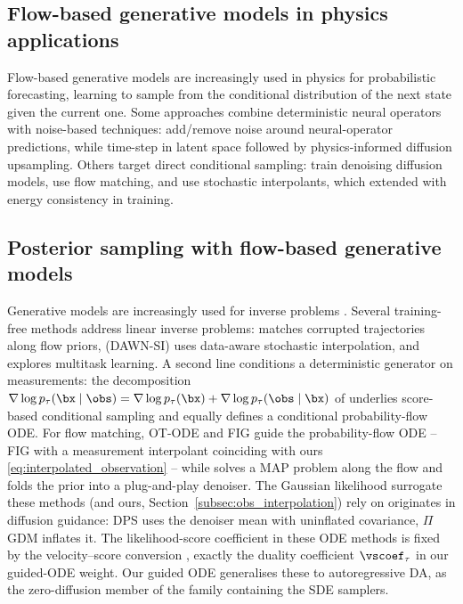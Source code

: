 
\subsection{Flow-based generative models in physics applications}

Flow-based generative models are increasingly used in physics for probabilistic forecasting, learning to sample from the conditional distribution of the next state given the current one. Some approaches combine deterministic neural operators with noise-based techniques: \cite{lippe_pde-refiner_2023} add/remove noise around neural-operator predictions, while \cite{gao_generative_2024} time-step in latent space followed by physics-informed diffusion upsampling. Others target direct conditional sampling: \cite{kohl_benchmarking_2024} train denoising diffusion models, \cite{fotiadis_stochastic_2024} use flow matching, and \cite{chen_probabilistic_2024} use stochastic interpolants, which \cite{mucke_physics-aware_2025} extended with energy consistency in training.

\subsection{Posterior sampling with flow-based generative models}
Generative models are increasingly used for inverse problems \cite{daras_survey_2024}. Several training-free methods address linear inverse problems: \cite{zhang_flow_2025} matches corrupted trajectories along flow priors, \cite{ahamed_dawn-si_2024} (DAWN-SI) uses data-aware stochastic interpolation, and \cite{negrel_multitask_2025} explores multitask learning. A second line conditions a deterministic generator on measurements: the decomposition $\nabla\log p_\tau(\bx\mid\obs)=\nabla\log p_\tau(\bx)+\nabla\log p_\tau(\obs\mid\bx)$ of \cite{song_score-based_2021} underlies score-based conditional sampling and equally defines a conditional probability-flow ODE. For flow matching, OT-ODE \cite{pokle_training-free_2024} and FIG \cite{yan_fig_2024} guide the probability-flow ODE -- FIG with a measurement interpolant coinciding with ours \eqref{eq:interpolated_observation} -- while \cite{zhang_flow_2025} solves a MAP problem along the flow and \cite{martin_pnp-flow_2025} folds the prior into a plug-and-play denoiser. The Gaussian likelihood surrogate these methods (and ours, Section~\ref{subsec:obs_interpolation}) rely on originates in diffusion guidance: DPS \cite{chung_diffusion_2023} uses the denoiser mean with uninflated covariance, $\Pi$GDM \cite{song_pseudoinverse_2023} inflates it. The likelihood-score coefficient in these ODE methods is fixed by the velocity--score conversion \cite{albergo_stochastic_2023, ma_sit_2024}, exactly the duality coefficient $\vscoef_\tau$ in our guided-ODE weight. Our guided ODE generalises these to autoregressive DA, as the zero-diffusion member of the family containing the SDE samplers.

